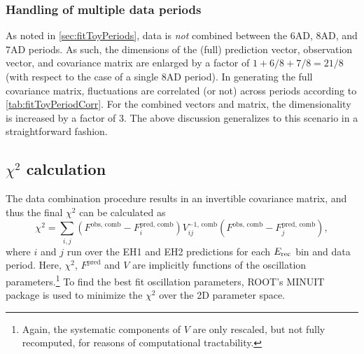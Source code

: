 \documentclass[../thesis.tex]{subfiles}
\begin{document}
\subsubsection{Handling of multiple data periods}

As noted in \autoref{sec:fitToyPeriods}, data is \emph{not} combined between the 6AD, 8AD, and 7AD periods. As such, the dimensions of the (full) prediction vector, observation vector, and covariance matrix are enlarged by a factor of $1 + 6/8 + 7/8 = 21/8$ (with respect to the case of a single 8AD period). In generating the full covariance matrix, fluctuations are correlated (or not) across periods according to \autoref{tab:fitToyPeriodCorr}. For the combined vectors and matrix, the dimensionality is increased by a factor of 3. The above discussion generalizes to this scenario in a straightforward fashion.

\begin{comment}
What do we ultimately get? Check P14A technote. 2 (near sites) x 3 (periods) = 4 predictions, over 37 energy bins. Size of covariance matrix is thus 37 x 2 x 3.
\end{comment}

\begin{comment}
Data is summed across all ADs in each near site.
\end{comment}

\begin{comment}
The far site prediction is summed across the four far ADs.
\end{comment}

\begin{comment}
The far site data is summed across the four far ADs.
\end{comment}

\begin{comment}
See CombineMatrix in Predictor.cc.
\end{comment}

\begin{comment}
Correlations are implemented at the level of the toy MC.
\end{comment}
\subsection{$\chi^2$ calculation}
\label{sec:fitChi2}

The data combination procedure results in an invertible covariance matrix, and thus the final $\chi^2$ can be calculated as
\begin{equation}
  \chi^2 = \sum_{i,j} (F^{\mathrm{obs},\,\mathrm{comb}} - F^{\mathrm{pred},\,\mathrm{comb}}_i) V^{-1,\,\mathrm{comb}}_{ij} (F^{\mathrm{obs},\,\mathrm{comb}} - F^{\mathrm{pred},\,\mathrm{comb}}_j),
\end{equation}
where $i$ and $j$ run over the EH1 and EH2 predictions for each $E_\mathrm{rec}$ bin and data period. Here, $\chi^2$, $F^{\mathrm{pred}}$ and $V$ are implicitly functions of the oscillation parameters.\footnote{Again, the systematic components of $V$ are only rescaled, but not fully recomputed, for reasons of computational tractability.} To find the best fit oscillation parameters, ROOT's MINUIT package is used to minimize the $\chi^2$ over the 2D parameter space.
\end{document}
